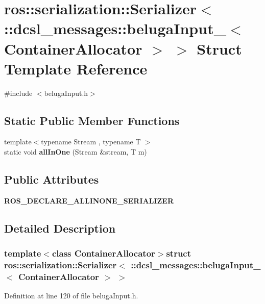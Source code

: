 \section{ros\-:\-:serialization\-:\-:\-Serializer$<$ \-:\-:dcsl\-\_\-messages\-:\-:beluga\-Input\-\_\-$<$ \-Container\-Allocator $>$ $>$ \-Struct \-Template \-Reference}
\label{structros_1_1serialization_1_1Serializer_3_01_1_1dcsl__messages_1_1belugaInput___3_01ContainerAllocator_01_4_01_4}


{\ttfamily \#include $<$beluga\-Input.\-h$>$}

\subsection*{\-Static \-Public \-Member \-Functions}
\begin{DoxyCompactItemize}
\item 
{\footnotesize template$<$typename Stream , typename T $>$ }\\static void {\bf all\-In\-One} (\-Stream \&stream, \-T m)
\end{DoxyCompactItemize}
\subsection*{\-Public \-Attributes}
\begin{DoxyCompactItemize}
\item 
{\bf \-R\-O\-S\-\_\-\-D\-E\-C\-L\-A\-R\-E\-\_\-\-A\-L\-L\-I\-N\-O\-N\-E\-\_\-\-S\-E\-R\-I\-A\-L\-I\-Z\-E\-R}
\end{DoxyCompactItemize}


\subsection{\-Detailed \-Description}
\subsubsection*{template$<$class Container\-Allocator$>$struct ros\-::serialization\-::\-Serializer$<$ \-::dcsl\-\_\-messages\-::beluga\-Input\-\_\-$<$ Container\-Allocator $>$ $>$}



\-Definition at line 120 of file beluga\-Input.\-h.




